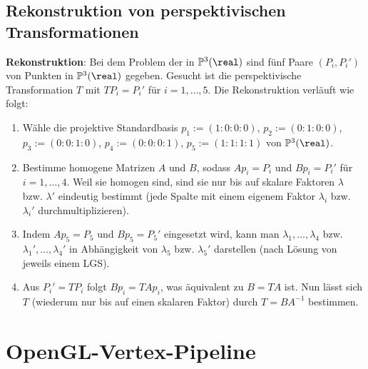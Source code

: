\pagebreak

\subsection{%
    Rekonstruktion von perspektivischen Transformationen%
}

\textbf{Rekonstruktion}:
Bei dem Problem der 
in $\PP^3(\real)$ sind fünf Paare $(P_i, P_i')$ von Punkten in $\PP^3(\real)$ gegeben.
Gesucht ist die perspektivische Transformation $T$ mit $TP_i = P_i'$ für $i = 1, \dotsc, 5$.
Die Rekonstruktion verläuft wie folgt:
\begin{enumerate}
    \item
    Wähle die projektive Standardbasis $p_1 := (1:0:0:0)$, $p_2 := (0:1:0:0)$,\\
    $p_3 := (0:0:1:0)$, $p_4 := (0:0:0:1)$, $p_5 := (1:1:1:1)$ von $\PP^3(\real)$.

    \item
    Bestimme homogene Matrizen $A$ und $B$, sodass $Ap_i = P_i$ und $Bp_i = P_i'$ für
    $i = 1, \dotsc, 4$.
    Weil sie homogen sind, sind sie nur bis auf skalare Faktoren $\lambda$ bzw. $\lambda'$
    eindeutig bestimmt
    (jede Spalte mit einem eigenem Faktor $\lambda_i$ bzw. $\lambda_i'$ durchmultiplizieren).

    \item
    Indem $Ap_5 = P_5$ und $Bp_5 = P_5'$ eingesetzt wird, kann man $\lambda_1, \dotsc, \lambda_4$
    bzw. $\lambda_1', \dotsc, \lambda_4'$ in Abhängigkeit von $\lambda_5$ bzw. $\lambda_5'$
    darstellen (nach Lösung von jeweils einem LGS).

    \item
    Aus $P_i' = TP_i$ folgt $Bp_i = TAp_i$, was äquivalent zu $B = TA$ ist.
    Nun lässt sich $T$ (wiederum nur bis auf einen skalaren Faktor)
    durch $T = BA^{-1}$ bestimmen.
\end{enumerate}

\section{%
    OpenGL-Vertex-Pipeline%
}

